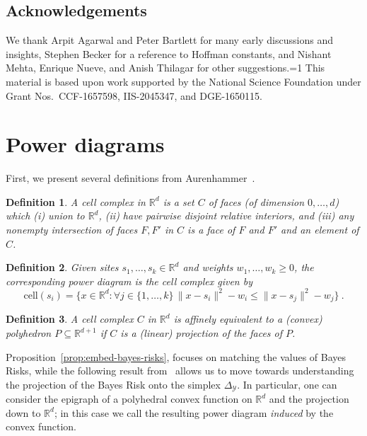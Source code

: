 \documentclass[11pt]{article}
\newcommand{\Comments}{1}
\newcommand{\mytodo}[2]{\ifnum\Comments=1%
  \todo[linecolor=#1!80!black,backgroundcolor=#1,bordercolor=#1!80!black]{#2}\fi}
\newcommand{\raft}[1]{\mytodo{green!20!white}{RF: #1}}
\newcommand{\reals}{\mathbb{R}}
\newcommand{\cell}{\mathrm{cell}}
\newcommand{\simplex}{\Delta_\Y}
\newcommand{\Y}{\mathcal{Y}}
\newtheorem{definition}{Definition}
\begin{document}
\subsection*{Acknowledgements}
We thank Arpit Agarwal and Peter Bartlett for many early discussions and insights,
Stephen Becker for a reference to Hoffman constants,
and Nishant Mehta, Enrique Nueve, and Anish Thilagar for other suggestions.\raft{others?}
This material is based upon work supported by the National Science Foundation under Grant Nos.\ CCF-1657598, IIS-2045347, and DGE-1650115.


\newpage



\appendix

\newpage
\section{Power diagrams}\label{app:power-diagrams}
First, we present several definitions from Aurenhammer~\cite{aurenhammer1987power}.
\begin{definition}\label{def:cell-complex}
  A \emph{cell complex} in $\reals^d$ is a set $C$ of faces (of dimension $0,\ldots,d$) which (i) union to $\reals^d$, (ii) have pairwise disjoint relative interiors, and (iii) any nonempty intersection of faces $F,F'$ in $C$ is a face of $F$ and $F'$ and an element of $C$.
\end{definition}

\begin{definition}\label{def:power-diagram}
  Given sites $s_1,\ldots,s_k\in\reals^d$ and weights $w_1,\ldots,w_k \geq 0$, the corresponding \emph{power diagram} is the cell complex given by
  \begin{equation}
    \label{eq:pd}
    \cell(s_i) = \{ x \in\reals^d : \forall j \in \{1,\ldots,k\} \, \|x - s_i\|^2 - w_i \leq \|x - s_j\|^2 - w_j\}~.
  \end{equation}
\end{definition}

\begin{definition}\label{def:affine-equiv}
  A cell complex $C$ in $\reals^d$ is \emph{affinely equivalent} to a (convex) polyhedron $P \subseteq \reals^{d+1}$ if $C$ is a (linear) projection of the faces of $P$.
\end{definition}

Proposition~\ref{prop:embed-bayes-risks}, focuses on matching the values of Bayes Risks, while the following result from~\citet{aurenhammer1987power} allows us to move towards understanding the projection of the Bayes Risk onto the simplex $\simplex$.
In particular, one can consider the epigraph of a polyhedral convex function on $\reals^d$ and the projection down to $\reals^d$; in this case we call the resulting power diagram \emph{induced} by the convex function.
\end{document}
